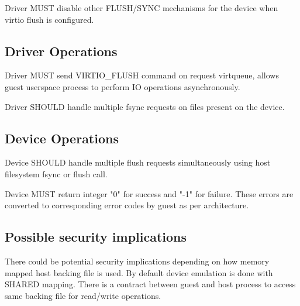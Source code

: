 Driver MUST disable other FLUSH/SYNC mechanisms for the device when virtio flush is configured.

\subsection{Driver Operations}\label{sec:Device Types / PMEM Driver / Driver Operation}

Driver MUST send VIRTIO_FLUSH command on request virtqueue, allows guest userspace process to perform IO operations asynchronously.

Driver SHOULD handle multiple fsync requests on files present on the device.

\subsection{Device Operations}\label{sec:Device Types / PMEM Driver / Device Operation}


Device SHOULD handle multiple flush requests simultaneously using host filesystem fsync or flush call.


Device MUST return integer "0" for success and "-1" for failure.
These errors are converted to corresponding error codes by guest
as per architecture.

\subsection{Possible security implications}\label{sec:Device Types / PMEM Device / Possible Security Implications}

There could be potential security implications depending on how
memory mapped host backing file is used. By default device emulation
is done with SHARED mapping. There is a contract between guest and host
process to access same backing file for read/write operations.

